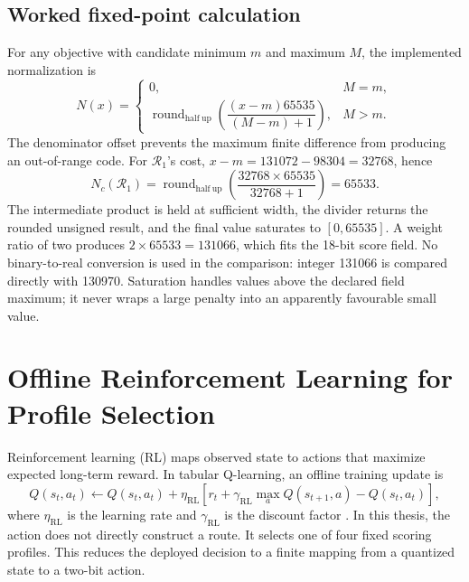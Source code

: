 \subsection{Worked fixed-point calculation}

For any objective with candidate minimum $m$ and maximum $M$, the implemented
normalization is
\begin{equation}
N(x)=\begin{cases}
0,&M=m,\\[2pt]
\operatorname{round}_{\mathrm{half\ up}}
\!\left(\dfrac{(x-m)65535}{(M-m)+1}\right),&M>m.
\end{cases}
\label{eq:bg-fixed-normalization}
\end{equation}
The denominator offset prevents the maximum finite difference from producing an
out-of-range code. For $\mathcal R_1$'s cost,
$x-m=131072-98304=32768$, hence
\begin{equation}
N_c(\mathcal R_1)=
\operatorname{round}_{\mathrm{half\ up}}
\left(\frac{32768\times65535}{32768+1}\right)=65533.
\end{equation}
The intermediate product is held at sufficient width, the divider returns the
rounded unsigned result, and the final value saturates to $[0,65535]$. A weight
ratio of two produces $2\times65533=131066$, which fits the 18-bit score field.
No binary-to-real conversion is used in the comparison: integer 131066 is compared
directly with 130970. Saturation handles values above the declared field maximum; it
never wraps a large penalty into an apparently favourable small value.

\section{Offline Reinforcement Learning for Profile Selection}

Reinforcement learning (RL) maps observed state to actions that maximize expected
long-term reward. In tabular Q-learning, an offline training update is
\begin{equation}
Q(s_t,a_t)\leftarrow Q(s_t,a_t)+\eta_{\mathrm{RL}}
\left[r_t+\gamma_{\mathrm{RL}}\max_a Q(s_{t+1},a)-Q(s_t,a_t)\right],
\label{eq:q-learning}
\end{equation}
where $\eta_{\mathrm{RL}}$ is the learning rate and $\gamma_{\mathrm{RL}}$ is the
discount factor \cite{watkins1992qlearning,sutton2018rl}. In this thesis, the action
does not directly construct a route. It selects one of four fixed scoring profiles.
This reduces the deployed decision to a finite mapping from a quantized state to a
two-bit action.

